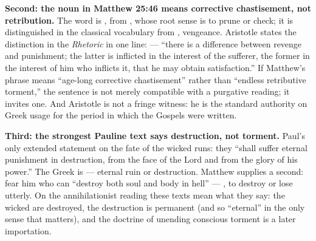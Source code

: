 \textbf{Second: the noun in Matthew 25:46 means corrective chastisement, not retribution.} The word is , from , whose root sense is to prune or check; it is distinguished in the classical vocabulary from , vengeance. Aristotle states the distinction in the \emph{Rhetoric} in one line:  --- ``there is a difference between revenge and punishment; the latter is inflicted in the interest of the sufferer, the former in the interest of him who inflicts it, that he may obtain satisfaction.'' If Matthew's phrase means ``age-long corrective chastisement'' rather than ``endless retributive torment,'' the sentence is not merely compatible with a purgative reading; it invites one. And Aristotle is not a fringe witness: he is the standard authority on Greek usage for the period in which the Gospels were written.

\textbf{Third: the strongest Pauline text says destruction, not torment.} Paul's only extended statement on the fate of the wicked runs: they ``shall suffer eternal punishment in destruction, from the face of the Lord and from the glory of his power.'' The Greek is  --- eternal ruin or destruction. Matthew supplies a second: fear him who can ``destroy both soul and body in hell'' --- , to destroy or lose utterly. On the annihilationist reading these texts mean what they say: the wicked are destroyed, the destruction is permanent (and so ``eternal'' in the only sense that matters), and the doctrine of unending conscious torment is a later importation.

